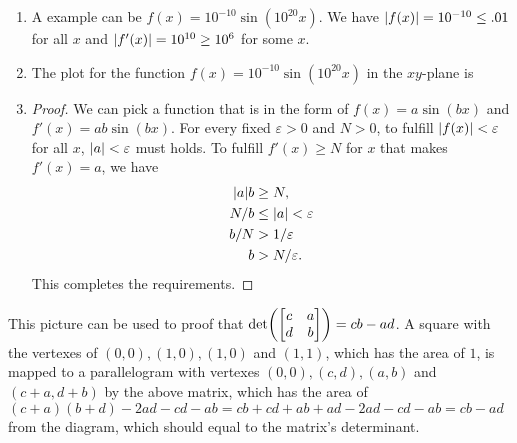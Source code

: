 \documentclass[8pt,twocolumn]{article}
\begin{document}
\begin{Answer}[number=26]
  \begin{enumerate}
    \item A example can be $f(x)=10^{-10}\sin(10^{20}x)$. We have
      $\abs{f(x)}=10^{-10}\le.01$ for all $x$ and $\abs{f'(x)}=10^{10}\ge10^6$ for some $x$.
    \item The plot for the function $f(x)=10^{-10}\sin(10^{20}x)$ in the
      $xy$-plane is

    \item \begin{proof}
        We can pick a function that is in the form of $f(x) = a\sin(bx)$ and
        $f'(x)=ab\sin(bx)$. For every fixed $\varepsilon> 0$ and $N> 0$, to
        fulfill $\abs{f(x)}<\varepsilon$ for all $x$, $\abs{a} < \varepsilon$
        must holds. To fulfill $f'(x)\ge N$ for $x$ that makes $f'(x)=a$,
        we have
        \begin{align*}
          \abs{a}b &\ge N, \\
          N/b &\le \abs{a} < \varepsilon  \\
          b/N &> 1/\varepsilon  \\
          b &> N/\varepsilon.
        \end{align*}
        This completes the requirements.
    \end{proof}
  \end{enumerate}
\end{Answer}

\begin{Answer}[number=27]
  This picture can be used to proof that \(\det(\mqty[c & a \\ d & b]) =
  cb-ad\). A square with the
  vertexes of $(0,0), (1, 0), (1, 0)$ and $(1,1)$, which has the area of $1$,
  is mapped to a parallelogram with vertexes $(0,0), (c,d), (a, b)$ and $(c+a,
  d+b)$ by the above matrix, which has the area of $(c+a)(b+d)-2ad-cd-ab=cb+cd+ab+ad-2ad-cd-ab =
  cb-ad$ from the diagram, which should equal to the matrix's determinant.
\end{Answer}
\end{document}
